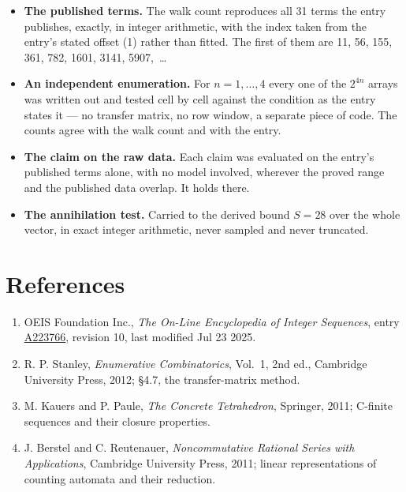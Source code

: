 \documentclass[11pt]{article}
\theoremstyle{definition}
\begin{document}
\begin{itemize}

\item {\bfseries The published terms.} The walk count reproduces all 31 terms the entry publishes, exactly, in integer arithmetic, with the index taken from the entry's stated offset (1) rather than fitted. The first of them are 11, 56, 155, 361, 782, 1601, 3141, 5907,~\dots

\item {\bfseries An independent enumeration.} For $n = 1,\dots,4$ every one of the $2^{4n}$ arrays was written out and tested cell by cell against the condition as the entry states it --- no transfer matrix, no row window, a separate piece of code. The counts agree with the walk count and with the entry.

\item {\bfseries The claim on the raw data.} Each claim was evaluated on the entry's published terms alone, with no model involved, wherever the proved range and the published data overlap. It holds there.

\item {\bfseries The annihilation test.} Carried to the derived bound $S = 28$ over the whole vector, in exact integer arithmetic, never sampled and never truncated.

\end{itemize}

\section{References}

\begin{enumerate}

\item OEIS Foundation Inc., \emph{The On-Line Encyclopedia of Integer Sequences}, entry \href{https://oeis.org/A223766}{A223766}, revision 10, last modified Jul 23 2025.

\item R. P. Stanley, \emph{Enumerative Combinatorics}, Vol.~1, 2nd ed., Cambridge University Press, 2012; \S4.7, the transfer-matrix method.

\item M. Kauers and P. Paule, \emph{The Concrete Tetrahedron}, Springer, 2011; C-finite sequences and their closure properties.

\item J. Berstel and C. Reutenauer, \emph{Noncommutative Rational Series with Applications}, Cambridge University Press, 2011; linear representations of counting automata and their reduction.

\end{enumerate}
\end{document}
